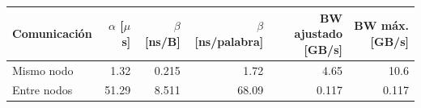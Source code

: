 \begin{tabular}{lrrrrr}
\toprule
Comunicación & $\alpha$ [$\mu$s] & $\beta$ [ns/B] & $\beta$ [ns/palabra] & BW ajustado [GB/s] & BW máx. [GB/s] \\
\midrule
Mismo nodo & 1.32 & 0.215 & 1.72 & 4.65 & 10.6 \\
Entre nodos & 51.29 & 8.511 & 68.09 & 0.117 & 0.117 \\
\bottomrule
\end{tabular}
